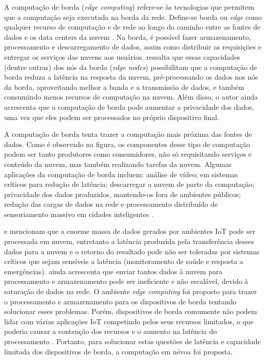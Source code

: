 
A computação de borda (\emph{edge computing}) refere-se às
tecnologias que permitem que a computação seja executada na borda da rede.
Define-se borda ou \emph{edge} como qualquer recurso de computação e de rede ao
longo do caminho entre as fontes de dados e os data centers da nuvem
\cite{Shi2016}. Na borda, é possível fazer armazenamento, processamento e
descarregamento de dados, assim como distribuir as requisições e entregar os
serviços das nuvens aos usuários.  ressalta que essas
capacidades (dentre outras) dos nós da borda (\emph{edge nodes}) possibilitam que a
computação de borda reduza a latência na resposta da nuvem, pré-processando os
dados nos nós da borda, aproveitando melhor a banda e a transmissão de dados, e
também consumindo menos recursos de computação na nuvem. Além disso, o autor
ainda acrescenta que a computação de borda pode aumentar a privacidade dos
dados, uma vez que eles podem ser processados no próprio dispositivo final.

A computação de borda tenta trazer a computação mais próxima das fontes de
dados.
Como é observado na figura, os
componentes desse tipo de computação podem ser tanto produtores como
consumidores, não só requisitando serviços e conteúdo da nuvem, mas também
realizando tarefas da nuvem.
Algumas aplicações da computação de borda incluem: análise de vídeo;
em sistemas críticos para redução de latência;
descarregar a nuvem de parte da computação;
privacidade dos dados produzidos, mantendo-os fora de ambientes públicos;
redução das cargas de dados na rede e
processamento distribuído de sensoriamento massivo em cidades inteligentes \cite{Shi2016}.


 e 
mencionam que a enorme massa de dados gerados por ambientes IoT pode ser
processada em nuvem, entretanto a latência produzida pela transferência desses
dados para a nuvem e o retorno do resultado pode não ser toleradas por sistemas
críticos que sejam sensíveis a latência (monitoramento de saúde e resposta a
emergências).
 ainda acrescenta que enviar tantos
dados à nuvem
para processamento e armazenamento pode ser ineficiente e não escalável, devido à
saturação de dados na rede.
O ambiente \emph{edge computing} foi proposto para trazer o
processamento e armazenamento para os dispositivos de borda tentando solucionar
esses problemas.
Porém, dispositivos de borda comumente não podem lidar com várias
aplicações IoT competindo pelos seus recursos limitados, o que poderia causar a
contenção dos recursos e o aumento na latência do processamento
\cite{Dastjerdi2016}. Portanto, para solucionar estas questões de latência e
capacidade limitada dos dispositivos de borda, a computação em névoa foi proposta.

